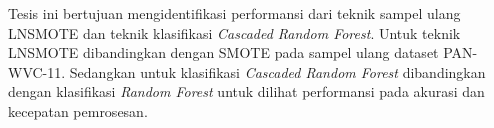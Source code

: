 Tesis ini bertujuan mengidentifikasi performansi dari teknik sampel ulang
LNSMOTE dan teknik klasifikasi
\textit{Cascaded Random Forest}.
Untuk teknik LNSMOTE dibandingkan dengan SMOTE pada sampel ulang dataset
PAN-WVC-11.
Sedangkan untuk klasifikasi
\textit{Cascaded Random Forest}
dibandingkan dengan klasifikasi
\textit{Random Forest}
untuk dilihat performansi pada akurasi dan kecepatan pemrosesan.
